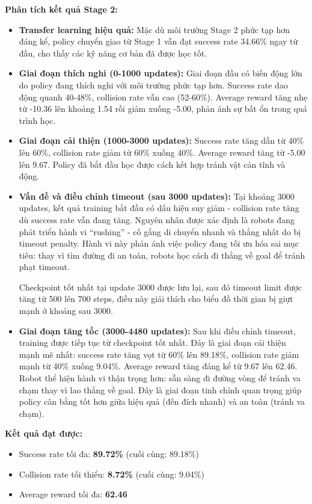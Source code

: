\textbf{Phân tích kết quả Stage 2:}
\begin{itemize}[nosep]
\item \textbf{Transfer learning hiệu quả:} Mặc dù môi trường Stage 2 phức tạp hơn đáng kể, policy chuyển giao từ Stage 1 vẫn đạt success rate 34.66\% ngay từ đầu, cho thấy các kỹ năng cơ bản đã được học tốt.

\item \textbf{Giai đoạn thích nghi (0-1000 updates):} Giai đoạn đầu có biến động lớn do policy đang thích nghi với môi trường phức tạp hơn. Success rate dao động quanh 40-48\%, collision rate vẫn cao (52-60\%). Average reward tăng nhẹ từ -10.36 lên khoảng 1.54 rồi giảm xuống -5.00, phản ánh sự bất ổn trong quá trình học.

\item \textbf{Giai đoạn cải thiện (1000-3000 updates):} Success rate tăng dần từ 40\% lên 60\%, collision rate giảm từ 60\% xuống 40\%. Average reward tăng từ -5.00 lên 9.67. Policy đã bắt đầu học được cách kết hợp tránh vật cản tĩnh và động.

\item \textbf{Vấn đề và điều chỉnh timeout (sau 3000 updates):} Tại khoảng 3000 updates, kết quả training bắt đầu có dấu hiệu suy giảm - collision rate tăng dù success rate vẫn đang tăng. Nguyên nhân được xác định là robots đang phát triển hành vi ``rushing'' - cố gắng di chuyển nhanh và thẳng nhất do bị timeout penalty. Hành vi này phản ánh việc policy đang tối ưu hóa sai mục tiêu: thay vì tìm đường đi an toàn, robots học cách đi thẳng về goal để tránh phạt timeout.

Checkpoint tốt nhất tại update 3000 được lưu lại, sau đó timeout limit được tăng từ 500 lên 700 steps, điều này giải thích cho biểu đồ thời gian bị giựt mạnh ở khoảng sau 3000.

\item \textbf{Giai đoạn tăng tốc (3000-4480 updates):} Sau khi điều chỉnh timeout, training được tiếp tục từ checkpoint tốt nhất. Đây là giai đoạn cải thiện mạnh mẽ nhất: success rate tăng vọt từ 60\% lên 89.18\%, collision rate giảm mạnh từ 40\% xuống 9.04\%. Average reward tăng đáng kể từ 9.67 lên 62.46. Robot thể hiện hành vi thận trọng hơn: sẵn sàng đi đường vòng để tránh va chạm thay vì lao thẳng về goal. Đây là giai đoạn tinh chỉnh quan trọng giúp policy cân bằng tốt hơn giữa hiệu quả (đến đích nhanh) và an toàn (tránh va chạm).
\end{itemize}

\textbf{Kết quả đạt được:}
\begin{itemize}[nosep]
\item Success rate tối đa: \textbf{89.72\%} (cuối cùng: 89.18\%)
\item Collision rate tối thiểu: \textbf{8.72\%} (cuối cùng: 9.04\%)
\item Average reward tối đa: \textbf{62.46}
\end{itemize}

